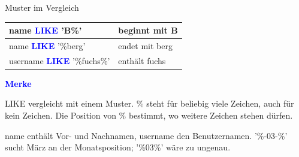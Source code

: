 \documentclass[10pt,a4paper]{article}
\newcommand{\sqlkw}[1]{\textcolor{Blue}{\bfseries #1}}
\newcommand{\merkebox}[1]{%
  \begin{tcolorbox}[colback=Mint,colframe=Blue,arc=2mm,boxrule=.8pt,
    left=3mm,right=3mm,top=1.5mm,bottom=1.5mm]
  \textcolor{Blue}{\bfseries Merke}\par\vspace{.5mm}
  {\fontsize{9.6}{11.6}\selectfont #1}
  \end{tcolorbox}}
\newcommand{\smallcaption}[1]{{\small\color{Muted}#1}\par\vspace{.5mm}}
\begin{document}
\smallcaption{Muster im Vergleich}
{\fontsize{8.8}{10.4}\selectfont\begin{tabularx}{\linewidth}{|>{\ttfamily}l|X|}\hline
\rowcolor{Sky}name \sqlkw{LIKE} 'B\%' & beginnt mit B\\\hline
name \sqlkw{LIKE} '\%berg' & endet mit berg\\\hline
username \sqlkw{LIKE} '\%fuchs\%' & enthält fuchs\\\hline
\end{tabularx}}
\par\vspace{.2mm}
\merkebox{LIKE vergleicht mit einem Muster. \% steht für beliebig viele Zeichen, auch für kein Zeichen. Die Position von \% bestimmt, wo weitere Zeichen stehen dürfen.}
{\fontsize{9}{10.5}\selectfont name enthält Vor- und Nachnamen, username den Benutzernamen. '\%-03-\%' sucht März an der Monatsposition; '\%03\%' wäre zu ungenau.}\par\vspace{.3mm}
\end{document}
